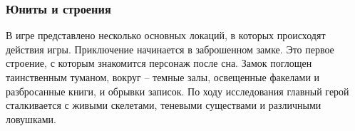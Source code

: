\documentclass{article}
\begin{document}
\subsubsection{Юниты и строения}
\par В игре представлено несколько основных локаций, в которых происходят действия игры. Приключение начинается в заброшенном замке. Это первое строение, с которым знакомится персонаж после сна. Замок поглощен таинственным туманом, вокруг – темные залы, освещенные факелами и разбросанные книги, и обрывки записок. По ходу исследования главный герой сталкивается с живыми скелетами, теневыми существами и различными ловушками. 
\begin{figure}
\begin{minipage}[h]{0.49\linewidth}
\end{minipage}
\hfill
\begin{minipage}[h]{0.49\linewidth}
\end{minipage}
\end{figure}
\end{document}
